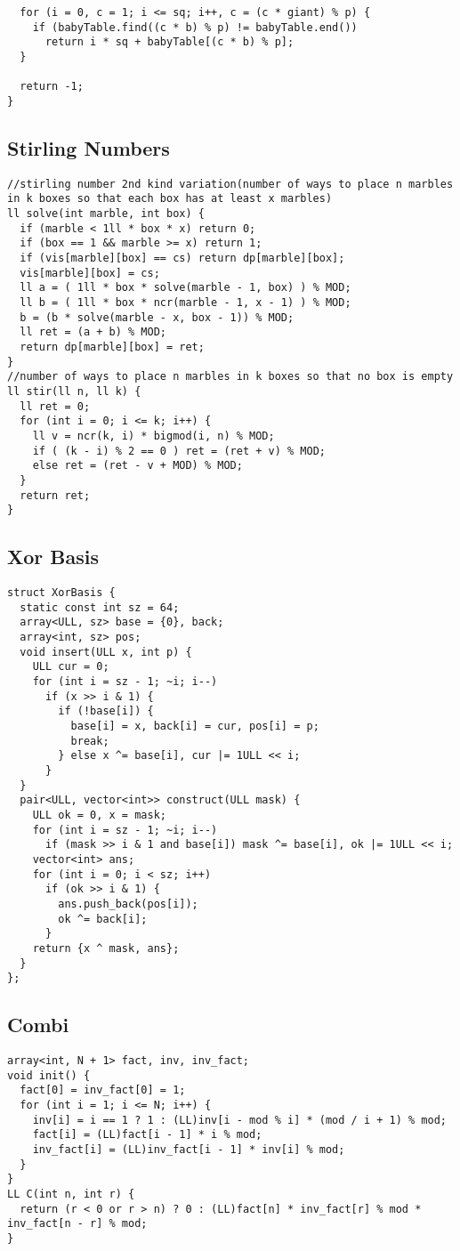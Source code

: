 \documentclass[FSZ,a4paper,onesided]{article}
\begin{document}
\begin{multicols*}{\COLS}
\begin{lstlisting}
  for (i = 0, c = 1; i <= sq; i++, c = (c * giant) % p) {
    if (babyTable.find((c * b) % p) != babyTable.end())
      return i * sq + babyTable[(c * b) % p];
  }

  return -1;
}
\end{lstlisting}
\subsection{Stirling Numbers}
\begin{lstlisting}
//stirling number 2nd kind variation(number of ways to place n marbles in k boxes so that each box has at least x marbles)
ll solve(int marble, int box) {
  if (marble < 1ll * box * x) return 0;
  if (box == 1 && marble >= x) return 1;
  if (vis[marble][box] == cs) return dp[marble][box];
  vis[marble][box] = cs;
  ll a = ( 1ll * box * solve(marble - 1, box) ) % MOD;
  ll b = ( 1ll * box * ncr(marble - 1, x - 1) ) % MOD;
  b = (b * solve(marble - x, box - 1)) % MOD;
  ll ret = (a + b) % MOD;
  return dp[marble][box] = ret;
}
//number of ways to place n marbles in k boxes so that no box is empty
ll stir(ll n, ll k) {
  ll ret = 0;
  for (int i = 0; i <= k; i++) {
    ll v = ncr(k, i) * bigmod(i, n) % MOD;
    if ( (k - i) % 2 == 0 ) ret = (ret + v) % MOD;
    else ret = (ret - v + MOD) % MOD;
  }
  return ret;
}
\end{lstlisting}
\subsection{Xor Basis}
\begin{lstlisting}
struct XorBasis {
  static const int sz = 64;
  array<ULL, sz> base = {0}, back;
  array<int, sz> pos;
  void insert(ULL x, int p) {
    ULL cur = 0;
    for (int i = sz - 1; ~i; i--)
      if (x >> i & 1) {
        if (!base[i]) {
          base[i] = x, back[i] = cur, pos[i] = p;
          break;
        } else x ^= base[i], cur |= 1ULL << i;
      }
  }
  pair<ULL, vector<int>> construct(ULL mask) {
    ULL ok = 0, x = mask;
    for (int i = sz - 1; ~i; i--)
      if (mask >> i & 1 and base[i]) mask ^= base[i], ok |= 1ULL << i;
    vector<int> ans;
    for (int i = 0; i < sz; i++)
      if (ok >> i & 1) {
        ans.push_back(pos[i]);
        ok ^= back[i];
      }
    return {x ^ mask, ans};
  }
};
\end{lstlisting}
\subsection{Combi}
\begin{lstlisting}
array<int, N + 1> fact, inv, inv_fact;
void init() {
  fact[0] = inv_fact[0] = 1;
  for (int i = 1; i <= N; i++) {
    inv[i] = i == 1 ? 1 : (LL)inv[i - mod % i] * (mod / i + 1) % mod;
    fact[i] = (LL)fact[i - 1] * i % mod;
    inv_fact[i] = (LL)inv_fact[i - 1] * inv[i] % mod;
  }
}
LL C(int n, int r) {
  return (r < 0 or r > n) ? 0 : (LL)fact[n] * inv_fact[r] % mod * inv_fact[n - r] % mod;
}
\end{lstlisting}

\end{multicols*}
\end{document}
